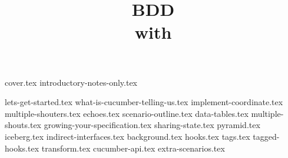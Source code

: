 \documentclass[a4paper,12pt]{report}
\title{BDD\\with\\\CUKE}
\begin{document}
{cover.tex}
{introductory-notes-only.tex}

{lets-get-started.tex}
{what-is-cucumber-telling-us.tex}
{implement-coordinate.tex}
{multiple-shouters.tex}
{echoes.tex}
{scenario-outline.tex}
{data-tables.tex}
{multiple-shouts.tex}
{growing-your-specification.tex}
{sharing-state.tex}
{pyramid.tex}
{iceberg.tex}
{indirect-interfaces.tex}
{background.tex}
{hooks.tex}
{tags.tex}
{tagged-hooks.tex}
{transform.tex}
{cucumber-api.tex}
{extra-scenarios.tex}
\end{document}
